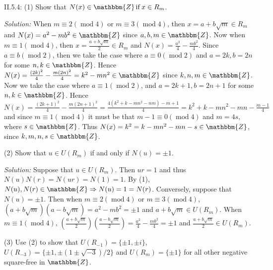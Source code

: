 \documentclass{letter}
\newcommand{\tmem}[1]{{\em #1\/}}
\newcommand{\tmop}[1]{\ensuremath{\operatorname{#1}}}
\begin{document}
II.5.4: (1) Show that $N (x) \in \mathbbm{Z} \tmop{if} x \in R_m$.

{\tmem{Solution:}} When $m \equiv 2 (\tmop{mod} 4)$ or $m \equiv 3 (\tmop{mod}
4)$, then $x = a + b \sqrt{m} \in R_m$ and $N (x) = a^2 - m b^2 \in
\mathbbm{Z}$ since $a, b, m \in \mathbbm{Z}$. Now when $m \equiv 1 (\tmop{mod}
4)$, then $x = \frac{a + b \sqrt{m}}{2} \in R_m$ and $N (x) = \frac{a^2}{4} -
\frac{m b^2}{4}$. Since $a \equiv b (\tmop{mod} 2)$, then we take the case
where $a \equiv 0 (\tmop{mod} 2)$ and $a = 2 k, b = 2 n$ for some $n, k \in
\mathbbm{Z}$. Hence $N (x) = \frac{(2 k)^2}{4} - \frac{m (2 n)^2}{4} = k^2 - m
n^2 \in \mathbbm{Z}$ since $k, n, m \in \mathbbm{Z}$. Now we take the case
where $a \equiv 1 (\tmop{mod} 2)$, and $a = 2 k + 1, b = 2 n + 1$ for some $n,
k \in \mathbbm{Z}$. Hence $N (x) = \frac{(2 k + 1)^2}{4} - \frac{m (2 n +
1)^2}{4} = \frac{4 (k^2 + k - m n^2 - n m) - m + 1}{4} = k^2 + k - m n^2 - m n
- \frac{m - 1}{4}$ and since $m \equiv 1 (\tmop{mod} 4)$ it must be that $m -
1 \equiv 0 (\tmop{mod} 4)$ and $m = 4 s$, where $s \in \mathbbm{Z}$. Thus $N
(x) = k^2 = k - m n^2 - m n - s \in \mathbbm{Z}$, since $k, m, n, s \in
\mathbbm{Z}$.

(2) Show that $u \in U (R_m)$ if and only if $N (u) = \pm 1$.

{\tmem{Solution:}} Suppose that $u \in U (R_m)$. Then $u r = 1$ and thus $N
(u) N (r) = N (u r) = N (1) = 1$. By (1), $N (u), N (r) \in \mathbbm{Z}
\Rightarrow N (u) = 1 = N (r)$. Conversely, suppose that $N (u) = \pm 1$. Then
when $m \equiv 2 (\tmop{mod} 4)$ or $m \equiv 3 (\tmop{mod} 4)$, $(a + b
\sqrt{m}) (a - b \sqrt{m}) = a^2 - m b^2 = \pm 1$ and $a + b \sqrt{m} \in U
(R_m)$. When $m \equiv 1 (\tmop{mod} 4)$, $( \frac{a + b \sqrt{m}}{2}) (
\frac{a - b \sqrt{m}}{2}) = \frac{a^2}{4} - \frac{m b^2}{4} = \pm 1$ and
$\frac{a + b \sqrt{m}}{2} \in U (R_m)$.

(3) Use (2) to show that $U (R_{- 1}) =\{\pm 1, \pm i\}$, $U (R_{- 3}) =\{\pm
1, \pm (1 \pm \sqrt{- 3}) / 2\}$ and $U (R_m) =\{\pm 1\}$ for all other
negative square-free in $\mathbbm{Z}$.
\end{document}

